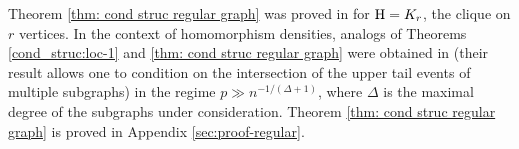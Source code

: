 \documentclass[a4paper,11pt,english,reqno]{amsart}
\numberwithin{equation}{section}
\renewcommand{\geq}{\geqslant}
\newcommand{\UTH}{\textup{UT}_{\textup{H}}(\delta)}
\newcommand{\uH}{\textup{H}}
\renewcommand{\P}{\mathbb{P}}
\newcommand{\G}{\mathbb{G}}
\newcommand{\tu}[1]{\textup{#1}}
\newcommand{\set}[1]{[\![#1]\!]}
\newtheorem{theorem}{Theorem}[section]
\newcommand{\purple}[1]{{\color{purple} #1}}
\begin{document}
	Theorem \ref{thm: cond struc regular graph} was proved in \cite{HMS} for $\uH=K_r$, the clique on $r$ vertices. In the context of homomorphism densities,  analogs of Theorems \ref{cond_struc:loc-1} and \ref{thm: cond struc regular graph} were obtained in \cite{CD24} (their result allows one to condition on the intersection of the upper tail events of multiple subgraphs) in the regime $p \gg n^{-1/(\Delta+1)}$, where $\Delta$ is the maximal degree of the subgraphs under consideration. %
	Theorem \ref{thm: cond struc regular graph} is proved in Appendix \ref{sec:proof-regular}.
	
\end{document}
